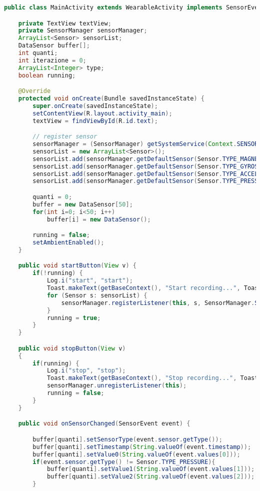 
\begin{lstlisting}[language=Java,  basicstyle=\footnotesize]
public class MainActivity extends WearableActivity implements SensorEventListener {

    private TextView textView;
    private SensorManager sensorManager;
    ArrayList<Sensor> sensorList;
    DataSensor buffer[];
    int quanti;
    int iterazione = 0;
    ArrayList<Integer> type;
    boolean running;

    @Override
    protected void onCreate(Bundle savedInstanceState) {
        super.onCreate(savedInstanceState);
        setContentView(R.layout.activity_main);
        textView = findViewById(R.id.text);

        // register sensor
        sensorManager = (SensorManager) getSystemService(Context.SENSOR_SERVICE);
        sensorList = new ArrayList<Sensor>();
        sensorList.add(sensorManager.getDefaultSensor(Sensor.TYPE_MAGNETIC_FIELD));
        sensorList.add(sensorManager.getDefaultSensor(Sensor.TYPE_GYROSCOPE));
        sensorList.add(sensorManager.getDefaultSensor(Sensor.TYPE_ACCELEROMETER));
        sensorList.add(sensorManager.getDefaultSensor(Sensor.TYPE_PRESSURE));

        quanti = 0;
        buffer = new DataSensor[50];
        for(int i=0; i<50; i++)
            buffer[i] = new DataSensor();

        running = false;
        setAmbientEnabled();
    }

    public void startButton(View v) {
        if(!running) {
            Log.i("start", "start");
            Toast.makeText(getBaseContext(), "Start recording...", Toast.LENGTH_LONG).show();
            for (Sensor s: sensorList) {
                sensorManager.registerListener(this, s, SensorManager.SENSOR_DELAY_FASTEST);
            }
            running = true;
        }
    }

    public void stopButton(View v)
    {
        if(running) {
            Log.i("stop", "stop");
            Toast.makeText(getBaseContext(), "Stop recording...", Toast.LENGTH_LONG).show();
            sensorManager.unregisterListener(this);
            running = false;
        }
    }

    public void onSensorChanged(SensorEvent event) {

        buffer[quanti].setSensorType(event.sensor.getType());
        buffer[quanti].setTimestamp(String.valueOf(event.timestamp));
        buffer[quanti].setValue0(String.valueOf(event.values[0]));
        if(event.sensor.getType() != Sensor.TYPE_PRESSURE){
            buffer[quanti].setValue1(String.valueOf(event.values[1]));
            buffer[quanti].setValue2(String.valueOf(event.values[2]));
        }


\end{lstlisting}
